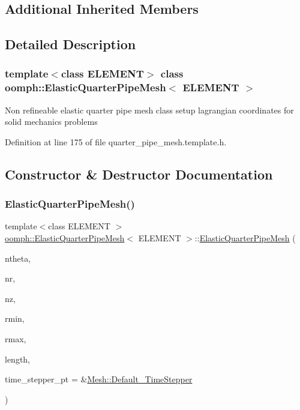 \subsection*{Additional Inherited Members}


\subsection{Detailed Description}
\subsubsection*{template$<$class E\+L\+E\+M\+E\+NT$>$\newline
class oomph\+::\+Elastic\+Quarter\+Pipe\+Mesh$<$ E\+L\+E\+M\+E\+N\+T $>$}

Non refineable elastic quarter pipe mesh class setup lagrangian coordinates for solid mechanics problems 

Definition at line 175 of file quarter\+\_\+pipe\+\_\+mesh.\+template.\+h.



\subsection{Constructor \& Destructor Documentation}
\mbox{\label{classoomph_1_1ElasticQuarterPipeMesh_a4ccb6983820b774bc72b7d469728ca30}} 
\subsubsection{\texorpdfstring{Elastic\+Quarter\+Pipe\+Mesh()}{ElasticQuarterPipeMesh()}}
{\footnotesize\ttfamily template$<$class E\+L\+E\+M\+E\+NT $>$ \\
\hyperlink{classoomph_1_1ElasticQuarterPipeMesh}{oomph\+::\+Elastic\+Quarter\+Pipe\+Mesh}$<$ E\+L\+E\+M\+E\+NT $>$\+::\hyperlink{classoomph_1_1ElasticQuarterPipeMesh}{Elastic\+Quarter\+Pipe\+Mesh} (\begin{DoxyParamCaption}\item[{const unsigned \&}]{ntheta,  }\item[{const unsigned \&}]{nr,  }\item[{const unsigned \&}]{nz,  }\item[{const double \&}]{rmin,  }\item[{const double \&}]{rmax,  }\item[{const double \&}]{length,  }\item[{\hyperlink{classoomph_1_1TimeStepper}{Time\+Stepper} $\ast$}]{time\+\_\+stepper\+\_\+pt = {\ttfamily \&\hyperlink{classoomph_1_1Mesh_a12243d0fee2b1fcee729ee5a4777ea10}{Mesh\+::\+Default\+\_\+\+Time\+Stepper}} }\end{DoxyParamCaption})\hspace{0.3cm}{\ttfamily [inline]}}



